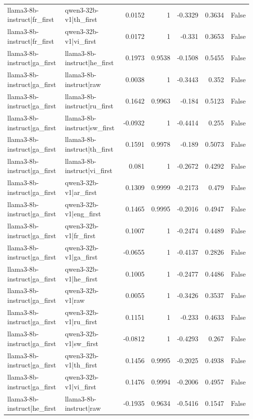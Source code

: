 \begin{table}
\begin{tabular}{l l r r r r l}
llama3-8b-instruct|fr_first & qwen3-32b-v1|th_first & 0.0152 & 1 & -0.3329 & 0.3634 & False \\
llama3-8b-instruct|fr_first & qwen3-32b-v1|vi_first & 0.0172 & 1 & -0.331 & 0.3653 & False \\
llama3-8b-instruct|ga_first & llama3-8b-instruct|he_first & 0.1973 & 0.9538 & -0.1508 & 0.5455 & False \\
llama3-8b-instruct|ga_first & llama3-8b-instruct|raw & 0.0038 & 1 & -0.3443 & 0.352 & False \\
llama3-8b-instruct|ga_first & llama3-8b-instruct|ru_first & 0.1642 & 0.9963 & -0.184 & 0.5123 & False \\
llama3-8b-instruct|ga_first & llama3-8b-instruct|sw_first & -0.0932 & 1 & -0.4414 & 0.255 & False \\
llama3-8b-instruct|ga_first & llama3-8b-instruct|th_first & 0.1591 & 0.9978 & -0.189 & 0.5073 & False \\
llama3-8b-instruct|ga_first & llama3-8b-instruct|vi_first & 0.081 & 1 & -0.2672 & 0.4292 & False \\
llama3-8b-instruct|ga_first & qwen3-32b-v1|ar_first & 0.1309 & 0.9999 & -0.2173 & 0.479 & False \\
llama3-8b-instruct|ga_first & qwen3-32b-v1|eng_first & 0.1465 & 0.9995 & -0.2016 & 0.4947 & False \\
llama3-8b-instruct|ga_first & qwen3-32b-v1|fr_first & 0.1007 & 1 & -0.2474 & 0.4489 & False \\
llama3-8b-instruct|ga_first & qwen3-32b-v1|ga_first & -0.0655 & 1 & -0.4137 & 0.2826 & False \\
llama3-8b-instruct|ga_first & qwen3-32b-v1|he_first & 0.1005 & 1 & -0.2477 & 0.4486 & False \\
llama3-8b-instruct|ga_first & qwen3-32b-v1|raw & 0.0055 & 1 & -0.3426 & 0.3537 & False \\
llama3-8b-instruct|ga_first & qwen3-32b-v1|ru_first & 0.1151 & 1 & -0.233 & 0.4633 & False \\
llama3-8b-instruct|ga_first & qwen3-32b-v1|sw_first & -0.0812 & 1 & -0.4293 & 0.267 & False \\
llama3-8b-instruct|ga_first & qwen3-32b-v1|th_first & 0.1456 & 0.9995 & -0.2025 & 0.4938 & False \\
llama3-8b-instruct|ga_first & qwen3-32b-v1|vi_first & 0.1476 & 0.9994 & -0.2006 & 0.4957 & False \\
llama3-8b-instruct|he_first & llama3-8b-instruct|raw & -0.1935 & 0.9634 & -0.5416 & 0.1547 & False \\

\end{tabular}
\end{table}
